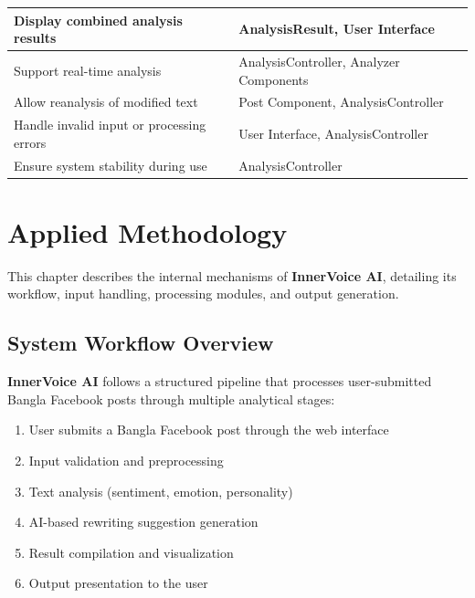 \documentclass[12pt,a4paper]{report}
\begin{document}
\begin{itemize}
\begin{table}[H]
\begin{tabularx}{\textwidth}{|l|X|}
\hline
Display combined analysis results & AnalysisResult, User Interface \\
\hline
Support real-time analysis & AnalysisController, Analyzer Components \\
\hline

Allow reanalysis of modified text & Post Component, AnalysisController \\
\hline
Handle invalid input or processing errors & User Interface, AnalysisController \\
\hline
Ensure system stability during use & AnalysisController \\
\hline
\end{tabularx}
\end{table}


\chapter{Applied Methodology}

This chapter describes the internal mechanisms of \textbf{InnerVoice AI}, detailing its workflow, input handling, processing modules, and output generation.

\section{System Workflow Overview}

\textbf{InnerVoice AI} follows a structured pipeline that processes user-submitted Bangla Facebook posts through multiple analytical stages:

\begin{enumerate}
    \item User submits a Bangla Facebook post through the web interface
    \item Input validation and preprocessing
    \item Text analysis (sentiment, emotion, personality)
    \item AI-based rewriting suggestion generation
    \item Result compilation and visualization
    \item Output presentation to the user
\end{enumerate}


\end{itemize}
\end{document}
